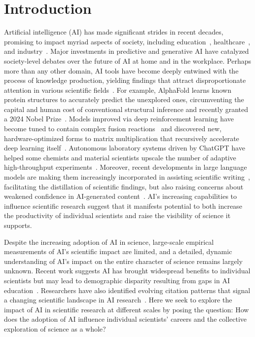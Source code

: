 \section*{Introduction}
Artificial intelligence (AI) has made significant strides in recent decades, promising to impact myriad aspects of society, including education~\supercite{adiguzel2023revolutionizing,akgun2022artificial}, healthcare~\supercite{mesko2023imperative,loh2022application}, and industry~\supercite{ahmed2022artificial}.
Major investments in predictive and generative AI have catalyzed society-level debates over the future of AI at home and in the workplace.
Perhaps more than any other domain, AI tools have become deeply entwined with the process of knowledge production, yielding findings that attract disproportionate attention in various scientific fields~\supercite{wang2023scientific}.
For example, AlphaFold learns known protein structures to accurately predict the unexplored ones, circumventing the capital and human cost of conventional structural inference and recently granted a 2024 Nobel Prize~\supercite{jumper2021highly,varadi2022alphafold}.
Models improved via deep reinforcement learning have become tuned to contain complex fusion reactions~\supercite{degrave2022magnetic} and discovered new, hardware-optimized forms to matrix multiplication that recursively accelerate deep learning itself~\supercite{fawzi2022discovering}. 
Autonomous laboratory systems driven by ChatGPT have helped some chemists and material scientists upscale the number of adaptive high-throughput experiments~\supercite{boiko2023autonomous,stokel2023chatgpt,gilson2023does}.
Moreover, recent developments in large language models are making them increasingly incorporated in assisting scientific writing~\supercite{salimi2023large,liang2024mapping,hwang2024can,kobak2025delving}, facilitating the distillation of scientific findings, but also raising concerns about weakened confidence in AI-generated content~\supercite{stokel2023chatgpt,gilson2023does, wojtowicz2025undermining}.
AI's increasing capabilities to influence scientific research suggest that it manifests potential to both increase the productivity of individual scientists and raise the visibility of science it supports.

Despite the increasing adoption of AI in science, large-scale empirical measurements of AI’s scientific impact are limited, and a detailed, dynamic understanding of AI’s impact on the entire character of science remains largely unknown. Recent work suggests AI has brought widespread benefits to individual scientists but may lead to demographic disparity resulting from gaps in AI education~\supercite{gao2024quantifying}. Researchers have also identified evolving citation patterns that signal a changing scientific landscape in AI research~\supercite{frank2019evolution}.
Here we seek to explore the impact of AI in scientific research at different scales by posing the question: How does the adoption of AI influence individual scientists’ careers and the collective exploration of science as a whole?

